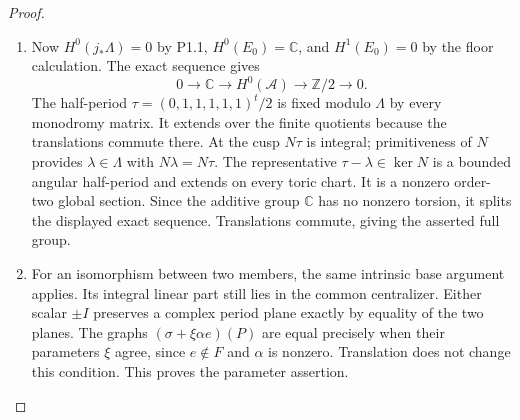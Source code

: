 \begin{proof}
\begin{enumerate}[label=\arabic*.]
\item Now $H^0(j_*\Lambda)=0$ by P1.1,
$H^0(E_0)=\mathbb C$, and $H^1(E_0)=0$ by the floor
calculation. The exact sequence gives
\[
0\to\mathbb C\to H^0(\mathcal A)\to\mathbb Z/2\to0.
\]
The half-period
$\tau=(0,1,1,1,1,1)^t/2$ is fixed modulo $\Lambda$
by every monodromy matrix. It extends over the finite
quotients because the translations commute there.
At the cusp $N\tau$ is integral; primitiveness of $N$
provides $\lambda\in\Lambda$ with $N\lambda=N\tau$.
The representative $\tau-\lambda\in\ker N$ is a bounded
angular half-period and extends on every toric chart.
It is a nonzero order-two global section. Since the
additive group $\mathbb C$ has no nonzero torsion, it
splits the displayed exact sequence. Translations
commute, giving the asserted full group.

\item For an isomorphism between two members, the same intrinsic
base argument applies. Its integral linear part still
lies in the common centralizer. Either scalar $\pm I$
preserves a complex period plane exactly by equality
of the two planes. The graphs
$(\sigma+\xi\alpha e)(P)$ are equal precisely when their
parameters $\xi$ agree, since $e\notin F$ and $\alpha$
is nonzero. Translation does not change this condition.
This proves the parameter assertion.

\end{enumerate}
\end{proof}




